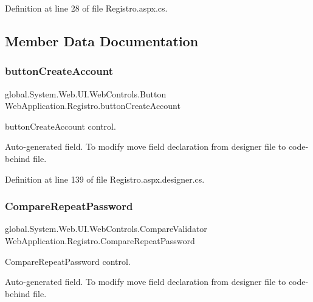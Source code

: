 Definition at line 28 of file Registro.\+aspx.\+cs.



\subsection{Member Data Documentation}
\mbox{\label{classWebApplication_1_1Registro_a4ea48eccdd4cc7019bb93236cec4102f}} 
\subsubsection{\texorpdfstring{buttonCreateAccount}{buttonCreateAccount}}
{\footnotesize\ttfamily global.\+System.\+Web.\+U\+I.\+Web\+Controls.\+Button Web\+Application.\+Registro.\+button\+Create\+Account\hspace{0.3cm}{\ttfamily [protected]}}



button\+Create\+Account control. 

Auto-\/generated field. To modify move field declaration from designer file to code-\/behind file. 

Definition at line 139 of file Registro.\+aspx.\+designer.\+cs.

\mbox{\label{classWebApplication_1_1Registro_a62c871a2abcb43fde486dc4539c595d3}} 
\subsubsection{\texorpdfstring{CompareRepeatPassword}{CompareRepeatPassword}}
{\footnotesize\ttfamily global.\+System.\+Web.\+U\+I.\+Web\+Controls.\+Compare\+Validator Web\+Application.\+Registro.\+Compare\+Repeat\+Password\hspace{0.3cm}{\ttfamily [protected]}}



Compare\+Repeat\+Password control. 

Auto-\/generated field. To modify move field declaration from designer file to code-\/behind file. 

